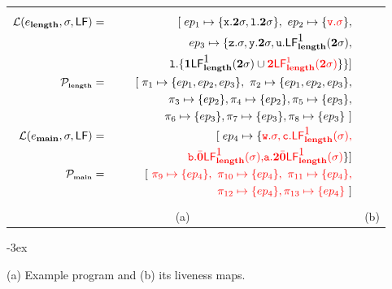 \documentclass[9pt]{sigplanconf}
\newcommand{\cred}[1]{{\color{red}{#1}}}
\begin{document}
\begin{figure}[t!]
\begin{tabular}{cc}
\begin{minipage}{.51\textwidth}
        \small
\begin{eqnarray*}
        \mathcal{L}(e_{\length},\sigma,\Lfonly) &=&
              [\;ep_1 \mapsto \lbrace \px.\clazy \sigma,
\xl.\clazy\sigma\rbrace ,~ep_2 \mapsto \lbrace \cred{
\pv.\sigma}  \rbrace,\\
 &&          \;\;  ep_3 \mapsto \lbrace \pz.\sigma,
                \py.\clazy\sigma,
\pu.\Lf{\length}{\mbox{1}}{\clazy\sigma},\\
&&            \;\;\;\;\;\;\;\;\;\;\;\;\;\;\;\;\;
\xl.\{ \acdr\Lf{\length}{\mbox{1}}{\clazy\sigma} \cup
\cred{\clazy\Lf{\length}{1}{\clazy\sigma}}\}\}
             \rbrack \\
            \cal{P_{\mbox{\tiny \length}}} &=&
                [\;\pi_1 \mapsto \lbrace ep_1, ep_2, ep_3 \rbrace,  \
                 \pi_2 \mapsto \lbrace ep_1, ep_2, ep_3
                  \rbrace, \\
&&\;\;  \pi_3 \mapsto \lbrace ep_2
                  \rbrace ,  \pi_4 \mapsto \lbrace ep_2
                  \rbrace, \pi_5 \mapsto \lbrace  ep_3 \rbrace, \\
 &&  \;\;                        \pi_6 \mapsto \lbrace ep_3 \rbrace,
\pi_7 \mapsto
                   \lbrace ep_3\rbrace, \pi_8 \mapsto \lbrace ep_3
\rbrace~\rbrack\\
              \mathcal{L}(e_{\main},\sigma,\Lfonly) &=&
                [\;
                  ep_4 \mapsto \lbrace \cred {\pw.\sigma,
                                       \pc.\Lf{\length}{\mbox{1}}{\sigma},}\\
&& \;\;\;\;\;\;\;\;\;\;\;\;\;\;\;\;\;\;
\cred{\pb.\bcar\Lf{\length}{\mbox{1}}{\sigma},}
\cred{\pa.\clazy\bcar\Lf{\length}{\mbox{1}}{\sigma}} \rbrace
                               ] \\
               \cal{P_{\mbox{\tiny \main}}} &=&
                  \lbrack~ \cred{\pi_9 \mapsto \lbrace ep_4 \rbrace,  \
                    \pi_{10} \mapsto \lbrace ep_4 \rbrace,  \
                   \pi_{11} \mapsto \lbrace ep_4 \rbrace,} \\
                   && \;\; \cred{\pi_{12} \mapsto \lbrace ep_4 \rbrace,
\pi_{13} \mapsto \lbrace ep_4 \rbrace}~\rbrack
\end{eqnarray*}
    \end{minipage} \\
(a)&
(b)
  \end{tabular}
\kern -3ex
\caption{(a) Example program and (b) its liveness
maps.}\label{fig:mot-example2}
\end{figure}
\end{document}
